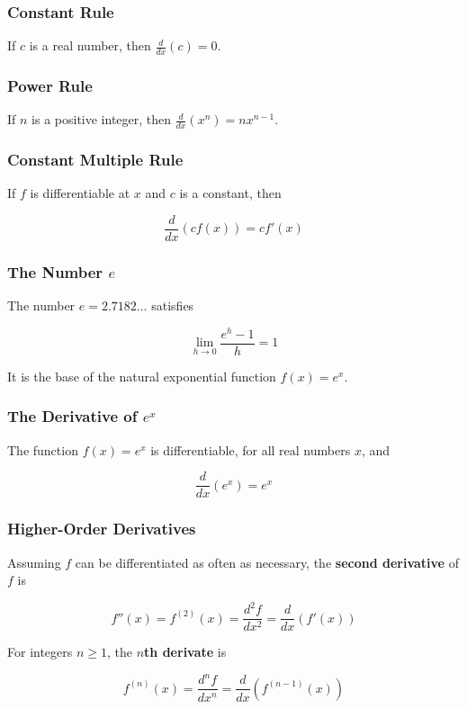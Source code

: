 %
%
%

\subsubsection{Constant Rule}
If $c$ is a real number, then $\frac{d}{dx}(c) = 0$.

\subsubsection{Power Rule}
If $n$ is a positive integer, then $\frac{d}{dx}(x^n) = nx^{n - 1}$.

\subsubsection{Constant Multiple Rule}
If $f$ is differentiable at $x$ and $c$ is a constant, then 

\begin{equation}
    \frac{d}{dx}(cf(x)) = cf'(x)
\end{equation}

\subsubsection{The Number $e$}
The number $e = 2.7182 \ldots$ satisfies

\begin{equation}
    \lim_{h \rightarrow 0} \frac{e^h - 1}{h} = 1
\end{equation}

It is the base of the natural exponential function $f(x) = e^x$.

\subsubsection{The Derivative of $e^x$}
The function $f(x) = e^x$ is differentiable, for all real numbers $x$, and 

\begin{equation}
    \frac{d}{dx} (e^x) = e^x
\end{equation}

\subsubsection{Higher-Order Derivatives}
Assuming $f$ can be differentiated as often as necessary, the \textbf{second derivative} of $f$ is

\begin{equation}
    f''(x) = f^{(2)}(x) = \frac{d^2 f}{dx^2} = \frac{d}{dx}\left(f'(x)\right)
\end{equation}

For integers $n \geq 1$, the \textbf{$n$th derivate} is

\begin{equation}
    f^{(n)}(x) = \frac{{d^n}f}{dx^n} = \frac{d}{dx}\left(f^{(n-1)}(x)\right)
\end{equation}
